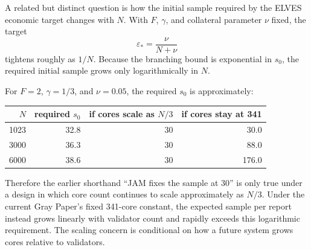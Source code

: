 A related but distinct question is how the initial sample required by the ELVES economic target changes with \(N\). With \(F\), \(\gamma\), and collateral parameter \(\nu\) fixed, the target
\[
\varepsilon_* = \frac{\nu}{N+\nu}
\]
tightens roughly as \(1/N\). Because the branching bound is exponential in \(s_0\), the required initial sample grows only logarithmically in \(N\).

For \(F=2\), \(\gamma=1/3\), and \(\nu=0.05\), the required \(s_0\) is approximately:
\begin{center}
\begin{tabular}{rrrr}
\toprule
\(N\) & required \(s_0\) & if cores scale as \(N/3\) & if cores stay at 341 \\
\midrule
1023 & 32.8 & 30 & 30.0 \\
3000 & 36.3 & 30 & 88.0 \\
6000 & 38.6 & 30 & 176.0 \\
\bottomrule
\end{tabular}
\end{center}

Therefore the earlier shorthand “JAM fixes the sample at 30” is only true under a design in which core count continues to scale approximately as \(N/3\). Under the current Gray Paper's fixed 341-core constant, the expected sample per report instead grows linearly with validator count and rapidly exceeds this logarithmic requirement. The scaling concern is conditional on how a future system grows cores relative to validators.
